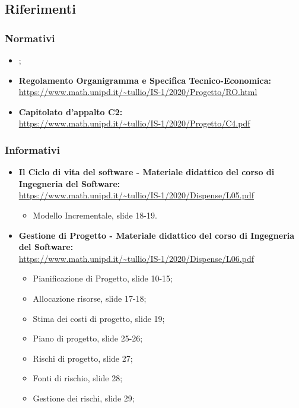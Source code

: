 \subsection{Riferimenti}
\subsubsection{Normativi}
\begin{itemize}
    \item {};
    \item \textbf{Regolamento Organigramma e Specifica Tecnico-Economica:}\\
    \url{https://www.math.unipd.it/~tullio/IS-1/2020/Progetto/RO.html}
    \item \textbf{Capitolato d'appalto C2:}\\
    \url{https://www.math.unipd.it/~tullio/IS-1/2020/Progetto/C4.pdf}
\end{itemize}

\subsubsection{Informativi}
\begin{itemize}
    \item \textbf{Il Ciclo di vita del software - Materiale didattico del corso di Ingegneria del Software:}\\
    \url{https://www.math.unipd.it/~tullio/IS-1/2020/Dispense/L05.pdf}
    \begin{itemize}
        \item Modello Incrementale, slide 18-19.
    \end{itemize}

    \item \textbf{Gestione di Progetto - Materiale didattico del corso di Ingegneria del Software:}\\
    \url{https://www.math.unipd.it/~tullio/IS-1/2020/Dispense/L06.pdf}
    \begin{itemize}
        \item Pianificazione di Progetto, slide 10-15;
        \item Allocazione risorse, slide 17-18;
        \item Stima dei costi di progetto, slide 19;
        \item Piano di progetto, slide 25-26;
        \item Rischi di progetto, slide 27;
        \item Fonti di rischio, slide 28;
        \item Gestione dei rischi, slide 29;
    \end{itemize}
\end{itemize}

